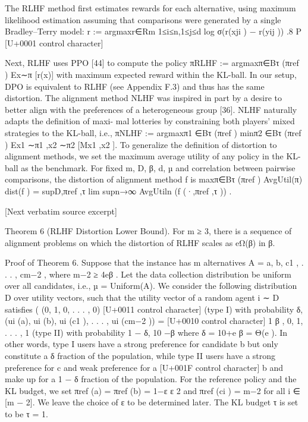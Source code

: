 \documentclass[10pt]{article}
\begin{document}
\begin{ReviewVerbatim}
The RLHF method first estimates rewards for each alternative, using maximum likelihood estimation
assuming that comparisons were generated by a single Bradley–Terry model:
                  r := argmaxr∈Rm 1≤i≤n,1≤j≤d log σ(r(xji ) − r(yij )) .8
                                     P                                     [U+0001 control character]

Next, RLHF uses PPO [44] to compute the policy πRLHF := argmaxπ∈Bτ (πref ) Ex∼π [r(x)] with
maximum expected reward within the KL-ball. In our setup, DPO is equivalent to RLHF (see
Appendix F.3) and thus has the same distortion.
The alignment method NLHF was inspired in part by a desire to better align with the
preferences of a heterogeneous group [36]. NLHF naturally adapts the definition of maxi-
mal lotteries by constraining both players’ mixed strategies to the KL-ball, i.e., πNLHF :=
argmaxπ1 ∈Bτ (πref ) minπ2 ∈Bτ (πref ) Ex1 ∼π1 ,x2 ∼π2 [Mx1 ,x2 ].
To generalize the definition of distortion to alignment methods, we set the maximum average utility of
any policy in the KL-ball as the benchmark. For fixed m, D, β, d, µ and correlation between pairwise
comparisons, the distortion of alignment method f is
                                                             maxπ∈Bτ (πref ) AvgUtil(π)
                      dist(f ) = supD,πref ,τ lim supn→∞       AvgUtiln (f (·,πref ,τ )) .

[Next verbatim source excerpt]

Theorem 6 (RLHF Distortion Lower Bound). For m ≥ 3, there is a sequence of alignment problems
on which the distortion of RLHF scales as eΩ(β) in β.

Proof of Theorem 6. Suppose that the instance has m alternatives A = {a, b, c1 , . . . , cm−2 }, where
m−2 ≥ 4eβ . Let the data collection distribution be uniform over all candidates, i.e., µ = Uniform(A).
We consider the following distribution D over utility vectors, such that the utility vector of a random
agent i ∼ D satisfies
                                                   (
                                                     (0, 1, 0, . . . , 0) [U+0011 control character] (type I) with probability δ,
   (ui (a), ui (b), ui (c1 ), . . . , ui (cm−2 )) = [U+0010 control character] 1
                                                       β , 0, 1, . . . , 1  (type II) with probability 1 − δ,
             10           −β
where δ = 10+e  β = Θ(e      ). In other words, type I users have a strong preference for candidate b
but only constitute a δ fraction of the population, while type II users have a strong preference for c
and weak preference for a [U+001F control character] b and make up for a 1 − δ fraction of the population.
For the reference policy and the KL budget, we set πref (a) = πref (b) = 1−ε                   ε
                                                                          2 and πref (ci ) = m−2 for
all i ∈ [m − 2]. We leave the choice of ε to be determined later. The KL budget τ is set to be τ = 1.



\end{ReviewVerbatim}
\end{document}
